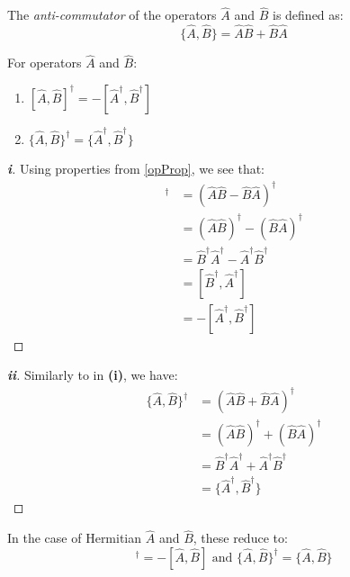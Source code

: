 \documentclass[../main.tex]{subfiles}
\begin{document}
\begin{definition}
  The \textit{anti-commutator} of the operators $\hat{A}$ and $\hat{B}$ is defined as:
  \[
    \{\hat{A},  \hat{B}\} = \hat{A} \hat{B} + \hat{B} \hat{A}
  \]
\end{definition}
\begin{lemma}
  For operators $\hat{A}$ and $\hat{B}$:
  \begin{enumerate}
    \item $[\hat{A}, \hat{B}]^{\dag} = -[\hat{A}^{\dag}, \hat{B}^{\dag}]$
    \item $\{\hat{A}, \hat{B}\}^{\dag} = \{\hat{A}^{\dag}, \hat{B}^{\dag}\}$
  \end{enumerate}
\end{lemma}
\begin{proof}[\textbf{i}]
  Using properties from \cref{opProp}, we see that:
  \begin{align*}
    [\hat{A}, \hat{B}]^{\dag} &= (\hat{A}\hat{B} - \hat{B}\hat{A})^{\dag} \\
                              &= (\hat{A} \hat{B})^{\dag} - (\hat{B} \hat{A})^{\dag} \\
                              &= \hat{B}^{\dag} \hat{A}^{\dag} - \hat{A}^{\dag} \hat{B}^{\dag} \\
                              &= [\hat{B}^{\dag}, \hat{A}^{\dag}] \\
                              &= -[\hat{A}^{\dag}, \hat{B}^{\dag}]
  \end{align*}
\end{proof}
\begin{proof}[\textbf{ii}]
  Similarly to in \textbf{(i)}, we have:
  \begin{align*}
    \{\hat{A}, \hat{B}\}^{\dag} &= (\hat{A}\hat{B} + \hat{B}\hat{A})^{\dag} \\
                              &= (\hat{A} \hat{B})^{\dag} + (\hat{B} \hat{A})^{\dag} \\
                              &= \hat{B}^{\dag} \hat{A}^{\dag} + \hat{A}^{\dag} \hat{B}^{\dag} \\
                              &= \{\hat{A}^{\dag}, \hat{B}^{\dag}\}
  \end{align*}
\end{proof}
\begin{remark}
  In the case of Hermitian $\hat{A}$ and $\hat{B}$, these reduce to:
  \begin{equation}
    [\hat{A}, \hat{B}]^{\dag} = - [\hat{A}, \hat{B}] \text{ and } \{\hat{A}, \hat{B}\}^{\dag} = \{\hat{A}, \hat{B}\} \label{commHerm}
  \end{equation}
\end{remark}
\end{document}
